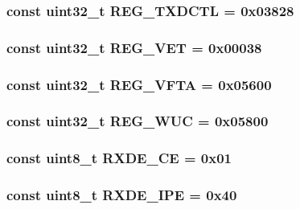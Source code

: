 \hypertarget{namespaceiGbReg_a236e025cbd514be3c492cb45614ba3ae}{
\subsubsection[{REG\_\-TXDCTL}]{\setlength{\rightskip}{0pt plus 5cm}const {\bf uint32\_\-t} {\bf REG\_\-TXDCTL} = 0x03828}}
\label{namespaceiGbReg_a236e025cbd514be3c492cb45614ba3ae}
\hypertarget{namespaceiGbReg_a1fa2f6b31ba0905012d75a5941a64966}{
\subsubsection[{REG\_\-VET}]{\setlength{\rightskip}{0pt plus 5cm}const {\bf uint32\_\-t} {\bf REG\_\-VET} = 0x00038}}
\label{namespaceiGbReg_a1fa2f6b31ba0905012d75a5941a64966}
\hypertarget{namespaceiGbReg_a36fae451371a57470da74bf7a9123d80}{
\subsubsection[{REG\_\-VFTA}]{\setlength{\rightskip}{0pt plus 5cm}const {\bf uint32\_\-t} {\bf REG\_\-VFTA} = 0x05600}}
\label{namespaceiGbReg_a36fae451371a57470da74bf7a9123d80}
\hypertarget{namespaceiGbReg_ae38d313c67812ad08bb3cd17222ab977}{
\subsubsection[{REG\_\-WUC}]{\setlength{\rightskip}{0pt plus 5cm}const {\bf uint32\_\-t} {\bf REG\_\-WUC} = 0x05800}}
\label{namespaceiGbReg_ae38d313c67812ad08bb3cd17222ab977}
\hypertarget{namespaceiGbReg_a9d23f5244c1a11d88cb7b4fe715f2356}{
\subsubsection[{RXDE\_\-CE}]{\setlength{\rightskip}{0pt plus 5cm}const uint8\_\-t {\bf RXDE\_\-CE} = 0x01}}
\label{namespaceiGbReg_a9d23f5244c1a11d88cb7b4fe715f2356}
\hypertarget{namespaceiGbReg_a0e09666185341c08fbc3e424f552eabf}{
\subsubsection[{RXDE\_\-IPE}]{\setlength{\rightskip}{0pt plus 5cm}const uint8\_\-t {\bf RXDE\_\-IPE} = 0x40}}
